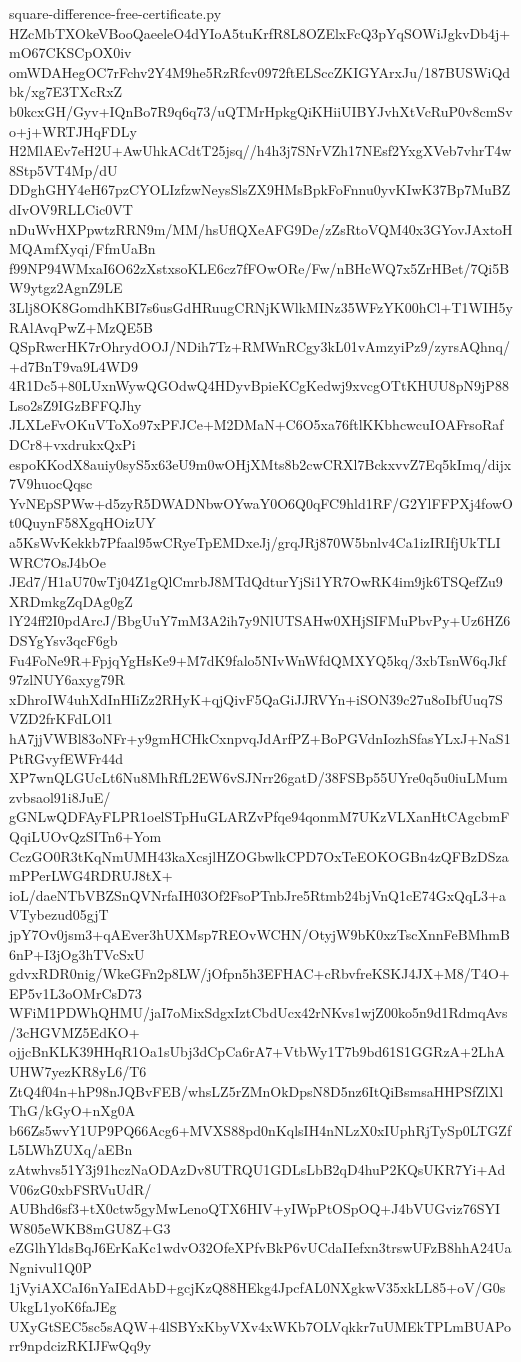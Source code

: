 \documentclass[11pt]{article}
\theoremstyle{definition}
\theoremstyle{remark}
\begin{document}
\begin{filecontents*}[overwrite]{square-difference-free-certificate.py}
HZcMbTXOkeVBooQaeeleO4dYIoA5tuKrfR8L8OZElxFcQ3pYqSOWiJgkvDb4j+mO67CKSCpOX0iv
omWDAHegOC7rFchv2Y4M9he5RzRfcv0972ftELSccZKIGYArxJu/187BUSWiQdbk/xg7E3TXcRxZ
b0kcxGH/Gyv+IQnBo7R9q6q73/uQTMrHpkgQiKHiiUIBYJvhXtVcRuP0v8cmSvo+j+WRTJHqFDLy
H2MlAEv7eH2U+AwUhkACdtT25jsq//h4h3j7SNrVZh17NEsf2YxgXVeb7vhrT4w8Stp5VT4Mp/dU
DDghGHY4eH67pzCYOLIzfzwNeysSlsZX9HMsBpkFoFnnu0yvKIwK37Bp7MuBZdIvOV9RLLCic0VT
nDuWvHXPpwtzRRN9m/MM/hsUflQXeAFG9De/zZsRtoVQM40x3GYovJAxtoHMQAmfXyqi/FfmUaBn
f99NP94WMxaI6O62zXstxsoKLE6cz7fFOwORe/Fw/nBHcWQ7x5ZrHBet/7Qi5BW9ytgz2AgnZ9LE
3Llj8OK8GomdhKBI7s6usGdHRuugCRNjKWlkMINz35WFzYK00hCl+T1WIH5yRAlAvqPwZ+MzQE5B
QSpRwcrHK7rOhrydOOJ/NDih7Tz+RMWnRCgy3kL01vAmzyiPz9/zyrsAQhnq/+d7BnT9va9L4WD9
4R1Dc5+80LUxnWywQGOdwQ4HDyvBpieKCgKedwj9xvcgOTtKHUU8pN9jP88Lso2sZ9IGzBFFQJhy
JLXLeFvOKuVToXo97xPFJCe+M2DMaN+C6O5xa76ftlKKbhcwcuIOAFrsoRafDCr8+vxdrukxQxPi
espoKKodX8auiy0syS5x63eU9m0wOHjXMts8b2cwCRXl7BckxvvZ7Eq5kImq/dijx7V9huocQqsc
YvNEpSPWw+d5zyR5DWADNbwOYwaY0O6Q0qFC9hld1RF/G2YlFFPXj4fowOt0QuynF58XgqHOizUY
a5KsWvKekkb7Pfaal95wCRyeTpEMDxeJj/grqJRj870W5bnlv4Ca1izIRIfjUkTLIWRC7OsJ4bOe
JEd7/H1aU70wTj04Z1gQlCmrbJ8MTdQdturYjSi1YR7OwRK4im9jk6TSQefZu9XRDmkgZqDAg0gZ
lY24ff2I0pdArcJ/BbgUuY7mM3A2ih7y9NlUTSAHw0XHjSIFMuPbvPy+Uz6HZ6DSYgYsv3qcF6gb
Fu4FoNe9R+FpjqYgHsKe9+M7dK9falo5NIvWnWfdQMXYQ5kq/3xbTsnW6qJkf97zlNUY6axyg79R
xDhroIW4uhXdInHIiZz2RHyK+qjQivF5QaGiJJRVYn+iSON39c27u8oIbfUuq7SVZD2frKFdLOl1
hA7jjVWBl83oNFr+y9gmHCHkCxnpvqJdArfPZ+BoPGVdnIozhSfasYLxJ+NaS1PtRGvyfEWFr44d
XP7wnQLGUcLt6Nu8MhRfL2EW6vSJNrr26gatD/38FSBp55UYre0q5u0iuLMumzvbsaol91i8JuE/
gGNLwQDFAyFLPR1oelSTpHuGLARZvPfqe94qonmM7UKzVLXanHtCAgcbmFQqiLUOvQzSITn6+Yom
CczGO0R3tKqNmUMH43kaXcsjlHZOGbwlkCPD7OxTeEOKOGBn4zQFBzDSzamPPerLWG4RDRUJ8tX+
ioL/daeNTbVBZSnQVNrfaIH03Of2FsoPTnbJre5Rtmb24bjVnQ1cE74GxQqL3+aVTybezud05gjT
jpY7Ov0jsm3+qAEver3hUXMsp7REOvWCHN/OtyjW9bK0xzTscXnnFeBMhmB6nP+I3jOg3hTVcSxU
gdvxRDR0nig/WkeGFn2p8LW/jOfpn5h3EFHAC+cRbvfreKSKJ4JX+M8/T4O+EP5v1L3oOMrCsD73
WFiM1PDWhQHMU/jaI7oMixSdgxIztCbdUcx42rNKvs1wjZ00ko5n9d1RdmqAvs/3cHGVMZ5EdKO+
ojjcBnKLK39HHqR1Oa1sUbj3dCpCa6rA7+VtbWy1T7b9bd61S1GGRzA+2LhAUHW7yezKR8yL6/T6
ZtQ4f04n+hP98nJQBvFEB/whsLZ5rZMnOkDpsN8D5nz6ItQiBsmsaHHPSfZlXlThG/kGyO+nXg0A
b66Zs5wvY1UP9PQ66Acg6+MVXS88pd0nKqlsIH4nNLzX0xIUphRjTySp0LTGZfL5LWhZUXq/aEBn
zAtwhvs51Y3j91hczNaODAzDv8UTRQU1GDLsLbB2qD4huP2KQsUKR7Yi+AdV06zG0xbFSRVuUdR/
AUBhd6sf3+tX0ctw5gyMwLenoQTX6HIV+yIWpPtOSpOQ+J4bVUGviz76SYIW805eWKB8mGU8Z+G3
eZGlhYldsBqJ6ErKaKc1wdvO32OfeXPfvBkP6vUCdaIIefxn3trswUFzB8hhA24UaNgnivul1Q0P
1jVyiAXCaI6nYaIEdAbD+gcjKzQ88HEkg4JpcfAL0NXgkwV35xkLL85+oV/G0sUkgL1yoK6faJEg
UXyGtSEC5sc5sAQW+4lSBYxKbyVXv4xWKb7OLVqkkr7uUMEkTPLmBUAPorr9npdcizRKIJFwQq9y

\end{filecontents*}
\end{document}
